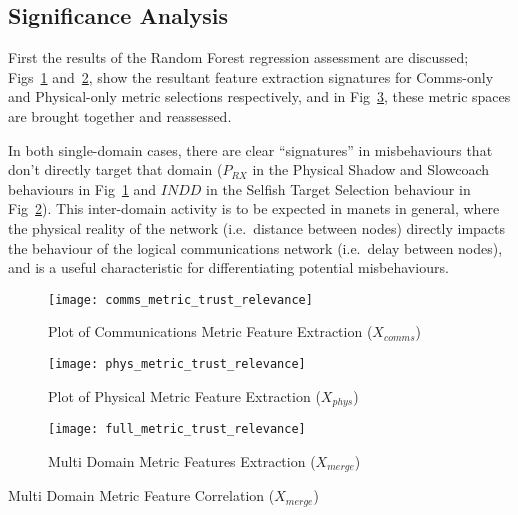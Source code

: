 \subsection{Significance Analysis}

First the results of the Random Forest regression assessment are discussed; Figs~\ref{fig:comms_feature_extraction} and~\ref{fig:phys_feature_extraction}, show the resultant feature extraction signatures for Comms-only and Physical-only metric selections respectively, and in Fig~\ref{fig:multi_feature_extraction}, these metric spaces are brought together and reassessed.

In both single-domain cases, there are clear ``signatures'' in misbehaviours that don't directly target that domain ($P_{RX}$ in the Physical Shadow and Slowcoach behaviours in Fig~\ref{fig:comms_feature_extraction} and $INDD$ in the Selfish Target Selection behaviour in Fig~\ref{fig:phys_feature_extraction}).
This inter-domain activity is to be expected in \glspl{manet} in general, where the physical reality of the network (i.e.\ distance between nodes) directly impacts the behaviour of the logical communications network (i.e.\ delay between nodes), and is a useful characteristic for differentiating potential misbehaviours.



\begin{figure}[h!]
  \centering
  \texttt{[image: comms\_metric\_trust\_relevance]}
  \caption{Plot of Communications Metric Feature Extraction ($X_{comms}$)}
  \label{fig:comms_feature_extraction}
\end{figure}

\begin{figure}[h!]
  \centering
  \texttt{[image: phys\_metric\_trust\_relevance]}
  \caption{Plot of Physical Metric Feature Extraction ($X_{phys}$)}
  \label{fig:phys_feature_extraction}
\end{figure}

\begin{figure}[h!]
  \centering
  \texttt{[image: full\_metric\_trust\_relevance]}
  \caption{Multi Domain  Metric Features Extraction ($X_{merge}$)}
  \label{fig:multi_feature_extraction}
\end{figure}

\begin{table}
  \centering
  \caption{Multi Domain Metric Feature Correlation ($X_{merge}$)}
  
  \label{tab:full_metric_correlations}
\end{table}



